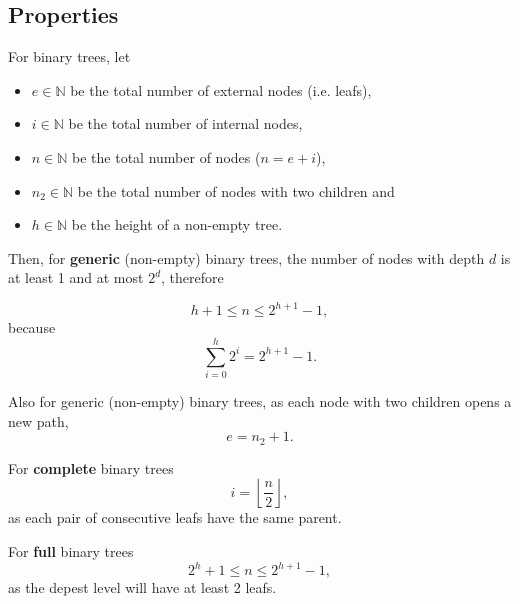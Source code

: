 \subsection{Properties}

For binary trees, let
\begin{itemize}

\item $e \in \mathbb{N}$ be the total number of external nodes (i.e. leafs),

\item $i \in \mathbb{N}$ be the total number of internal nodes,

\item $n \in \mathbb{N}$ be the total number of nodes ($n = e + i$),

\item $n_2 \in \mathbb{N}$ be the total number of nodes with two children and

\item $h \in \mathbb{N}$ be the height of a non-empty tree.

\end{itemize}

Then, for \textbf{generic} (non-empty) binary trees, the number of nodes with
depth $d$ is at least 1 and at most $2^d$, therefore

\begin{equation}
  h + 1 \le n \le 2^{h+1} - 1,
\end{equation}
because
\begin{equation}
  \sum_{i=0}^{h}2^i = 2^{h+1} - 1.
\end{equation}

Also for generic (non-empty) binary trees, as each node with two children opens
a new path, \begin{equation} e = n_2 + 1.  \end{equation}

For \textbf{complete} binary trees
\begin{equation}
  i = \left \lfloor{\frac{n}{2}}\right \rfloor,
\end{equation}
as each pair of consecutive leafs have the same parent.

For \textbf{full} binary trees
\begin{equation}
  2^h + 1 \le n \le 2^{h+1} - 1,
\end{equation}
as the depest level will have at least 2 leafs.
